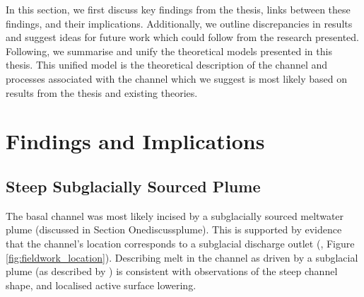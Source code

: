 







In this section, we first discuss key findings from the thesis, links between these findings, and their implications. Additionally, we outline discrepancies in results and suggest ideas for future work which could follow from the research presented.
Following,  we summarise and unify the theoretical models presented in this thesis. This unified model is the theoretical description of the channel and processes associated with the channel which we suggest is most likely based on results from the thesis and existing theories.


\section{Findings and Implications} \label{sec:findings}


\subsection{Steep Subglacially Sourced Plume}

The basal channel was most likely incised by a subglacially sourced meltwater plume (discussed in Section Onediscussplume). This is supported by evidence that the channel's location corresponds to a  subglacial discharge outlet (\cite{alley2016impacts,le2009subglacial}, Figure \ref{fig:fieldwork_location}).
Describing melt in the channel as driven by a subglacial plume (as described by \cite{jenkins1991one}) is consistent with observations of the steep channel shape, and localised active surface lowering.

